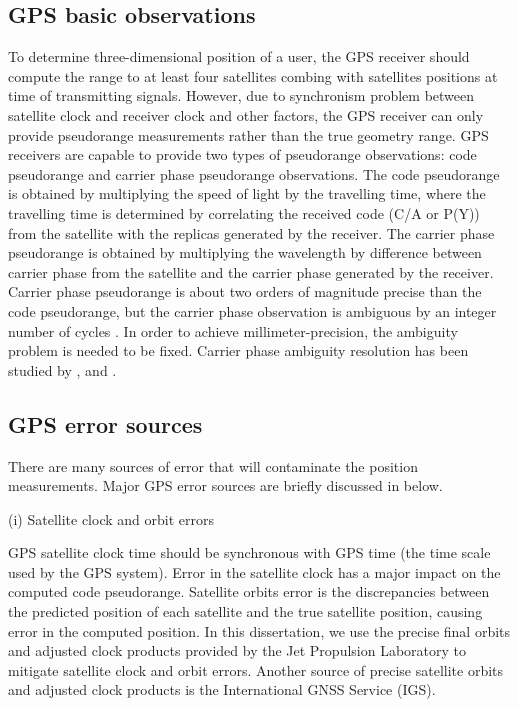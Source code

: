 \subsection{GPS basic observations}
To determine three-dimensional position of a user, the GPS receiver should compute the range to at least four satellites combing with satellites positions at time of transmitting signals.  However, due to synchronism problem between satellite clock and receiver clock and other factors, the GPS receiver can only provide pseudorange measurements rather than the true geometry range.  GPS receivers are capable to provide two types of pseudorange observations: code pseudorange and carrier phase pseudorange observations.  The code pseudorange is obtained by multiplying the speed of light by the travelling time, where the travelling time is determined by correlating the received code (C/A or P(Y)) from the satellite with the replicas generated by the receiver.  The carrier phase pseudorange is obtained by multiplying the wavelength by difference between carrier phase from the satellite and the carrier phase generated by the receiver.  Carrier phase pseudorange is about two orders of magnitude precise than the code pseudorange, but the carrier phase observation is ambiguous by an integer number of cycles \cite[]{remondi1985global}.  In order to achieve millimeter-precision, the ambiguity problem is needed to be fixed.  Carrier phase ambiguity resolution has been studied by \citet{lichten1987strategies}, \citet{blewitt1989chpt2,blewitt2008chpt2} and \citet{bertiger2010chpt2}. 
 
\subsection{GPS error sources}
There are many sources of error that will contaminate the position measurements. Major GPS error sources are briefly discussed in below.

(i) Satellite clock and orbit errors

GPS satellite clock time should be synchronous with GPS time (the time scale used by the GPS system).  Error in the satellite clock has a major impact on the computed code pseudorange.  Satellite orbits error is the discrepancies between the predicted position of each satellite and the true satellite position, causing error in the computed position.  In this dissertation, we use the precise final orbits and adjusted clock products provided by the Jet Propulsion Laboratory to mitigate satellite clock and orbit errors.  Another source of precise satellite orbits and adjusted clock products is the International GNSS Service (IGS).

